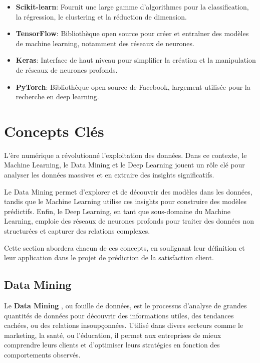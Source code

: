 \begin{itemize}
\begin{itemize}
        \item \textbf{Scikit-learn}: Fournit une large gamme d'algorithmes pour la classification, la régression, le clustering et la réduction de dimension.
        \item \textbf{TensorFlow}: Bibliothèque open source pour créer et entraîner des modèles de machine learning, notamment des réseaux de neurones.        \item \textbf{Keras}: Interface de haut niveau pour simplifier la création et la manipulation de réseaux de neurones profonds.
        \item \textbf{PyTorch}: Bibliothèque open source de Facebook, largement utilisée pour la recherche en deep learning.    \end{itemize}
\end{itemize}

\section{Concepts Clés}
L'ère numérique a révolutionné l'exploitation des données. Dans ce contexte, le Machine Learning, le Data Mining et le Deep Learning jouent un rôle clé pour analyser les données massives et en extraire des insights significatifs. 

Le Data Mining permet d'explorer et de découvrir des modèles dans les données, tandis que le Machine Learning utilise ces insights pour construire des modèles prédictifs. Enfin, le Deep Learning, en tant que sous-domaine du Machine Learning, emploie des réseaux de neurones profonds pour traiter des données non structurées et capturer des relations complexes.

Cette section abordera chacun de ces concepts, en soulignant leur définition et leur application dans le projet de prédiction de la satisfaction client.

\subsection{Data Mining}

Le \textbf{Data Mining} \cite{titleB1000}, ou fouille de données, est le processus d'analyse de grandes quantités de données pour découvrir des informations utiles, des tendances cachées, ou des relations insoupçonnées. Utilisé dans divers secteurs comme le marketing, la santé, ou l'éducation, il permet aux entreprises de mieux comprendre leurs clients et d'optimiser leurs stratégies en fonction des comportements observés.

